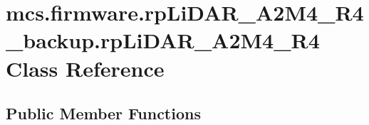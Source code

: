 \hypertarget{classmcs_1_1firmware_1_1rpLiDAR__A2M4__R4__backup_1_1rpLiDAR__A2M4__R4}{}\section{mcs.\+firmware.\+rp\+Li\+D\+A\+R\+\_\+\+A2\+M4\+\_\+\+R4\+\_\+backup.\+rp\+Li\+D\+A\+R\+\_\+\+A2\+M4\+\_\+\+R4 Class Reference}
\label{classmcs_1_1firmware_1_1rpLiDAR__A2M4__R4__backup_1_1rpLiDAR__A2M4__R4}
\subsection*{Public Member Functions}
